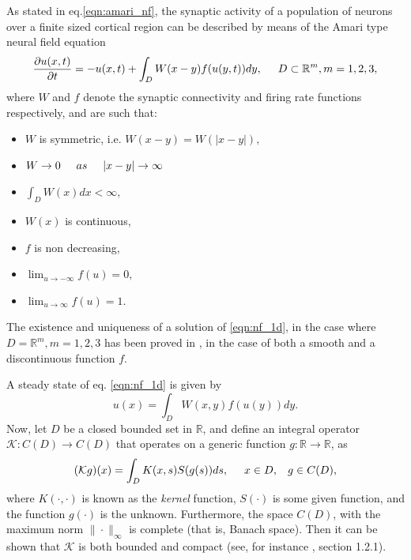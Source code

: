 \documentclass{uonmathreport}
\begin{document}
As stated in eq.\ref{eqn:amari_nf}, the synaptic activity of a population of neurons over a finite sized cortical region can be described by means of the Amari type neural field equation
\begin{equation}\label{eqn:nf_1d}
\frac{\partial u(x,t)}{\partial t} = -u(x,t) + \int_{D}W(x-y)f(u(y,t)) dy, \hspace{5mm} D \subset \mathbb{R}^m, m = 1,2,3,
\end{equation}
where $W$ and $f$ denote the synaptic connectivity and firing rate functions respectively, and are such that:
\begin{itemize}
	\itemsep-0.5em
	\item $W$ is symmetric, i.e. $W(x-y) = W(|x-y|),$
	\item $W \rightarrow 0 \hspace{5mm} as \hspace{5mm} |x-y| \rightarrow \infty$
	\item $\int_{D} W(x)dx < \infty,$
	\item $W(x)$ is continuous,
	\item $f$ is non decreasing,
	\item $\lim_{u \rightarrow -\infty} f(u) = 0,$
	\item $\lim_{u \rightarrow \infty} f(u) = 1$.
\end{itemize}

The existence and uniqueness of a solution of \ref{eqn:nf_1d}, in the case where $D = \mathbb{R}^m, m = 1,2,3$ has been proved in \cite{potthast2010existence}, in the case of both a smooth and a discontinuous function $f$.

A steady state of eq. \ref{eqn:nf_1d} is given by
\begin{equation}\label{eqn:steady_state}
u(x) = \int_{D}W(x,y)f(u(y)) dy.
\end{equation}
Now, let $D$ be a closed bounded set in $\mathbb{R}$, and define an integral operator $\mathcal{K}: C(D) \rightarrow C(D)$ that operates on a generic function $g: \mathbb{R} \rightarrow \mathbb{R}$, as
\begin{equation}\label{eqn:integral_operator}
(\mathcal{K}g)(x) = \int_D K(x, s)S(g(s)) ds, \hspace{5mm} x \in D, \hspace{3mm} g \in C(D),
\end{equation}
where $K(\cdot, \cdot)$ is known as the \textit{kernel} function, $S(\cdot)$ is some given function, and the function $g(\cdot)$ is the unknown. Furthermore, the space $C(D)$, with the maximum norm $\|\cdot\|_\infty$ is complete (that is, Banach space). Then it can be shown that $\mathcal{K}$ is both bounded and compact (see, for instance \cite{atkinson1976survey}, section 1.2.1).
\end{document}
